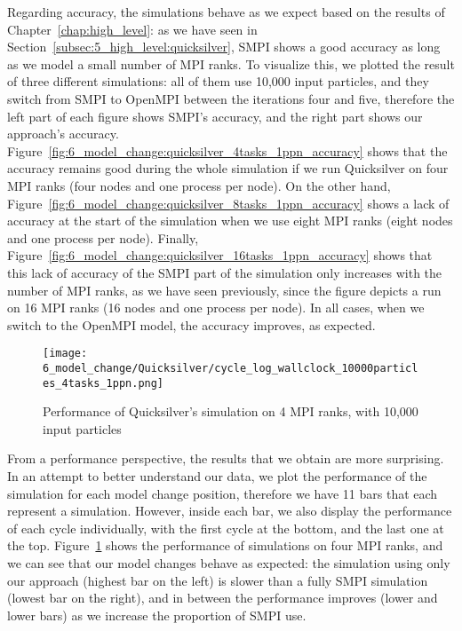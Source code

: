 Regarding accuracy, the simulations behave as we expect based on the results of
Chapter~\ref{chap:high_level}: as we have seen in
Section~\ref{subsec:5_high_level:quicksilver}, SMPI shows a good accuracy as
long as we model a small number of MPI ranks. To visualize this, we plotted the
result of three different simulations: all of them use 10,000 input particles,
and they switch from SMPI to OpenMPI between the iterations four and five,
therefore the left part of each figure shows SMPI's accuracy, and the right part
shows our approach's accuracy.
Figure~\ref{fig:6_model_change:quicksilver_4tasks_1ppn_accuracy} shows that the
accuracy remains good during the whole simulation if we run Quicksilver on four
MPI ranks (four nodes and one process per node). On the other hand,
Figure~\ref{fig:6_model_change:quicksilver_8tasks_1ppn_accuracy} shows a lack of
accuracy at the start of the simulation when we use eight MPI ranks (eight nodes
and one process per node). Finally,
Figure~\ref{fig:6_model_change:quicksilver_16tasks_1ppn_accuracy} shows that
this lack of accuracy of the SMPI part of the simulation only increases with the
number of MPI ranks, as we have seen previously, since the figure depicts a run
on 16 MPI ranks (16 nodes and one process per node). In all cases, when we
switch to the OpenMPI model, the accuracy improves, as expected.

\begin{figure}[!ht]
    \centering
    \texttt{[image: 6\_model\_change/Quicksilver/cycle\_log\_wallclock\_10000particles\_4tasks\_1ppn.png]}
    \caption{Performance of Quicksilver's simulation on 4 MPI ranks, with 10,000 input particles}
    \label{fig:6_model_change:quicksilver_4tasks_1ppn_perf}
\end{figure}

From a performance perspective, the results that we obtain are more surprising.
In an attempt to better understand our data, we plot the performance of the
simulation for each model change position, therefore we have 11 bars that each
represent a simulation. However, inside each bar, we also display the
performance of each cycle individually, with the first cycle at the bottom, and
the last one at the top.
Figure~\ref{fig:6_model_change:quicksilver_4tasks_1ppn_perf} shows the
performance of simulations on four MPI ranks, and we can see that our model
changes behave as expected: the simulation using only our approach (highest bar
on the left) is slower than a fully SMPI simulation (lowest bar on the right),
and in between the performance improves (lower and lower bars) as we increase
the proportion of SMPI use.

